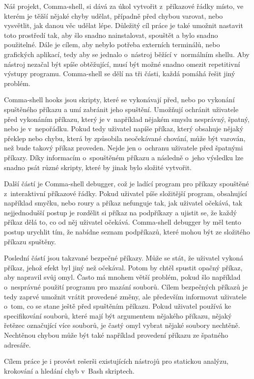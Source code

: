 \documentclass[thesis=M,czech]{FITthesis}[2012/06/26]
\begin{document}
\begin{introduction}
Náš projekt, Comma-shell, si dává za úkol vytvořit z~příkazové řádky místo, ve kterém je těžší nějaké chyby udělat, případně před chybou varovat, nebo vysvětlit, jak danou věc udělat lépe. Důležitý cíl práce je také umožnit nastavit toto prostředí tak, aby šlo snadno nainstalovat, spouštět a bylo snadno použitelné. Dále je cílem, aby nebylo potřeba externích terminálů, nebo grafických aplikací, tedy aby se jednalo o~nástroj běžící v~normálním shellu. Aby nástroj nezačal být spíše obtěžující, musí být možné snadno omezit repetitivní výstupy programu. Comma-shell se dělí na tři části, každá pomáhá řešit jiný problém.

Comma-shell hooks jsou skripty, které se vykonávají před, nebo po vykonání spuštěného příkazu a umí zabránit jeho spuštění. Umožňují ochránit uživatele před vykonáním příkazu, který je v~například nějakém smyslu nesprávný, špatný, nebo je v~nepořádku. Pokud tedy  uživatel napíše příkaz, který obsahuje nějaký překlep nebo chybu, která by způsobila neočekávané chování, může být varován, než bude takový příkaz proveden. Nejde jen o~ochranu uživatele před špatnými příkazy. Díky informacím o~spouštěném příkazu a následně o~jeho výsledku lze snadno psát různé skripty, které by jinak bylo složité vytvořit.

Další částí je Comma-shell debugger, což je ladící program pro příkazy spouštěné z~interaktivní příkazové řádky. Pokud uživatel píše složitější program, obsahující například smyčku, nebo roury a příkaz nefunguje tak, jak uživatel očekává, tak nejjednodušší postup je rozdělit si příkaz na podpříkazy a ujistit se, že každý příkaz dělá to, co od něj uživatel očekává. Comma-shell debugger by měl tento postup urychlit tím, že nabídne seznam podpříkazů, které mohou být ze složitého příkazu spuštěny.

Poslední částí jsou takzvané bezpečné příkazy. Může se stát, že uživatel vykoná příkaz, jehož efekt byl jiný než očekával. Potom by chtěl spustit opačný příkaz, aby napravil svůj omyl. Často má mnohem větší problém, pokud šlo například o~nesprávné použití programu pro mazání souborů. Cílem bezpečných příkazů je tedy zaprvé umožnit vrátit provedené změny, ale především informovat uživatele o~tom, co se stane ještě před spuštěním příkazu. Pokud uživatel používá ke specifikování souborů, které mají být argumentem nějakého příkazu, nějaký řetězec označující více souborů, je častý omyl vybrat nějaké soubory nechtěně. Nechtěnou chybou může být také například provedení příkazu ze špatného adresáře.

Cílem práce je i provést rešerši existujících nástrojů pro statickou analýzu, krokování a hledání chyb v~Bash skriptech.


\end{introduction}
\end{document}
